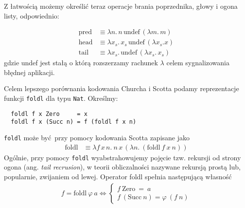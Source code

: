 Z łatwością możemy określić teraz operacje brania poprzednika, głowy i ogona listy, odpowiednio:

\begin{align*}
  \mathrm{pred}&\equiv \lambda n .\, n\, \mathrm{undef}\, (\lambda m.\,m)\\
  \mathrm{head}&\equiv \lambda x_s .\, x_s\, \mathrm{undef}\, (\lambda x_s . x)\\
  \mathrm{tail}&\equiv \lambda x_s.\, \mathrm{undef}\, (\lambda x_s.\,x_s)
\end{align*}
gdzie undef jest stałą o którą rozszerzamy rachunek \(\lambda\) celem sygnalizowania błędnej aplikacji.

  Celem lepszego porównania kodowania Churcha i Scotta podamy reprezentacje funkcji \texttt{foldl} dla typu \texttt{Nat}. Określmy:
\begin{verbatim}
  foldl f x Zero     = x
  foldl f x (Succ n) = f (foldl f x n)
\end{verbatim}
\texttt{foldl} może być przy pomocy kodowania Scotta zapisane jako
\begin{align*}
  \mathrm{foldl}  &\equiv \lambda f\,x\,n.\ n\,x\,(\lambda n.\ (\mathrm{foldl}\ f\ x\ n))
\end{align*}
Ogólnie, przy pomocy \texttt{foldl} wyabstrahowujemy pojęcie tzw. rekursji od strony ogona (ang. \emph{tail recrusion}), w teorii obliczalności nazywane rekursją prostą lub, popularnie, zwijaniem od lewej. Operator foldl spełnia następującą własność \cite{Hutton:1999:TUE:968578.968579}
  \begin{align}\label{def:foldl} 
     f = \mathrm{foldl}\ \varphi\  a \iff \begin{cases}
       f\ \mathrm{Zero}\ =\ a\\
       f\ (\mathrm{Succ}\ n) = \varphi\ (f\ n)
     \end{cases}
  \end{align}



